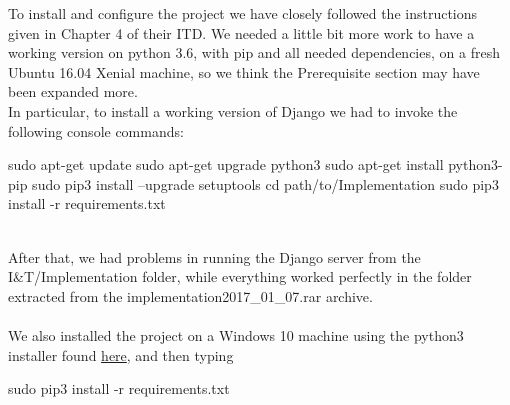 
To install and configure the project we have closely followed the instructions given in Chapter 4 of their ITD. We needed a little bit more work to have a working version on python 3.6, with pip and all needed dependencies, on a fresh Ubuntu 16.04 Xenial machine, so we think the Prerequisite section may have been expanded more. \\
In particular, to install a working version of Django we had to invoke the following console commands: \\

\begin{commandshell}
sudo apt-get update
sudo apt-get upgrade python3
sudo apt-get install python3-pip
sudo pip3 install --upgrade setuptools
cd path/to/Implementation
sudo pip3 install -r requirements.txt
\end{commandshell}
~\\
After that, we had problems in running the Django server from the I\&T/Implementation folder, while everything worked perfectly in the folder extracted from the implementation2017\_01\_07.rar archive. \\
~\\
We also installed the project on a Windows 10 machine using the python3 installer found \href{https://www.python.it/download/}{here}, and then typing 
\begin{commandshell}
sudo pip3 install -r requirements.txt
\end{commandshell}